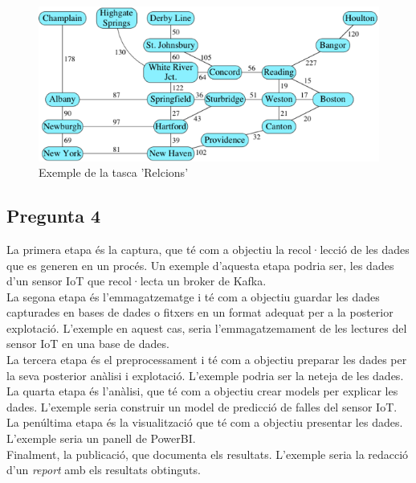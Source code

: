 \documentclass[a4paper,12pt]{report}
\begin{document}
\begin{figure}
    \centering
    \includegraphics[scale =1.3]{images/8aa21944eef2879cea9080a2ae2fbcb98cec0ddf.png}
    \caption{Exemple de la tasca 'Relcions'}
    \label{fig:relacions}
\end{figure}
\newpage
\subsection*{Pregunta 4}
La primera etapa és la captura, que té com a objectiu la recol·lecció de les dades que es generen en un procés. Un exemple d'aquesta etapa podria ser, les dades d'un sensor IoT que recol·lecta un broker de Kafka.\\
La segona etapa és l'emmagatzematge i té com a objectiu guardar les dades capturades en bases de dades o fitxers en un format adequat per a la posterior explotació. L'exemple en aquest cas, seria l'emmagatzemament de les lectures del sensor IoT en una base de dades.\\
La tercera etapa és el preprocessament i té com a objectiu preparar les dades per la seva posterior anàlisi i explotació. L'exemple podria ser la neteja de les dades.\\
La quarta etapa és l'anàlisi, que té com a objectiu crear models per explicar les dades. L'exemple seria construir un model de predicció de falles del sensor IoT.\\
La penúltima etapa és la visualització que té com a objectiu presentar les dades. L'exemple seria un panell de PowerBI.\\
Finalment, la publicació, que documenta els resultats. L'exemple seria la redacció d'un \textit{report} amb els resultats obtinguts.
\end{document}
